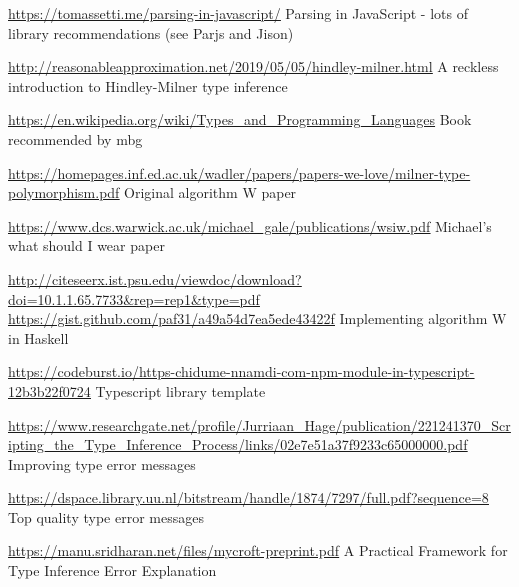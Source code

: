 \documentclass[a4paper,fleqn,12pt]{article}
\begin{document}
\underline{\href{https://tomassetti.me/parsing-in-javascript/}{https://tomassetti.me/parsing-in-javascript/}}
Parsing in JavaScript - lots of library recommendations (see Parjs and Jison)

\underline{\href{http://reasonableapproximation.net/2019/05/05/hindley-milner.html}{http://reasonableapproximation.net/2019/05/05/hindley-milner.html}}
A reckless introduction to Hindley-Milner type inference

\underline{\href{https://en.wikipedia.org/wiki/Types\_and\_Programming\_Languages}{https://en.wikipedia.org/wiki/Types\_and\_Programming\_Languages}}
Book recommended by mbg

\underline{\href{https://homepages.inf.ed.ac.uk/wadler/papers/papers-we-love/milner-type-polymorphism.pdf}{https://homepages.inf.ed.ac.uk/wadler/papers/papers-we-love/milner-type-polymorphism.pdf}}
Original algorithm W paper

\underline{\href{https://www.dcs.warwick.ac.uk/michael\_gale/publications/wsiw.pdf}{https://www.dcs.warwick.ac.uk/michael\_gale/publications/wsiw.pdf}}
Michael’s what should I wear paper

\underline{\href{http://citeseerx.ist.psu.edu/viewdoc/download?doi=10.1.1.65.7733\&rep=rep1\&type=pdf}{http://citeseerx.ist.psu.edu/viewdoc/download?doi=10.1.1.65.7733\&rep=rep1\&type=pdf}}
\underline{\href{https://gist.github.com/paf31/a49a54d7ea5ede43422f}{https://gist.github.com/paf31/a49a54d7ea5ede43422f}}
Implementing algorithm W in Haskell

\underline{\href{https://codeburst.io/https-chidume-nnamdi-com-npm-module-in-typescript-12b3b22f0724}{https://codeburst.io/https-chidume-nnamdi-com-npm-module-in-typescript-12b3b22f0724}}
Typescript library template

\underline{\href{https://www.researchgate.net/profile/Jurriaan\_Hage/publication/221241370\_Scripting\_the\_Type\_Inference\_Process/links/02e7e51a37f9233c65000000.pdf}{https://www.researchgate.net/profile/Jurriaan\_Hage/publication/221241370\_Scripting\_the\_Type\_Inference\_Process/links/02e7e51a37f9233c65000000.pdf}}
Improving type error messages

\underline{\href{https://dspace.library.uu.nl/bitstream/handle/1874/7297/full.pdf?sequence=8}{https://dspace.library.uu.nl/bitstream/handle/1874/7297/full.pdf?sequence=8}}
Top quality type error messages

\underline{\href{https://manu.sridharan.net/files/mycroft-preprint.pdf}{https://manu.sridharan.net/files/mycroft-preprint.pdf}}
A Practical Framework for Type Inference Error Explanation
\end{document}
